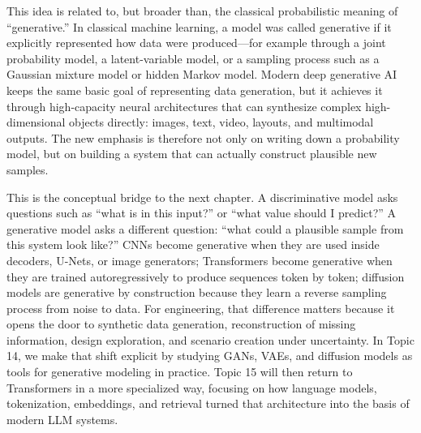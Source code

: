 \documentclass[12pt]{article}
\begin{document}
This idea is related to, but broader than, the classical probabilistic meaning of ``generative.'' In classical machine learning, a model was called generative if it explicitly represented how data were produced---for example through a joint probability model, a latent-variable model, or a sampling process such as a Gaussian mixture model or hidden Markov model. Modern deep generative AI keeps the same basic goal of representing data generation, but it achieves it through high-capacity neural architectures that can synthesize complex high-dimensional objects directly: images, text, video, layouts, and multimodal outputs. The new emphasis is therefore not only on writing down a probability model, but on building a system that can actually construct plausible new samples.

This is the conceptual bridge to the next chapter. A discriminative model asks questions such as ``what is in this input?'' or ``what value should I predict?'' A generative model asks a different question: ``what could a plausible sample from this system look like?'' CNNs become generative when they are used inside decoders, U-Nets, or image generators; Transformers become generative when they are trained autoregressively to produce sequences token by token; diffusion models are generative by construction because they learn a reverse sampling process from noise to data. For engineering, that difference matters because it opens the door to synthetic data generation, reconstruction of missing information, design exploration, and scenario creation under uncertainty. In Topic 14, we make that shift explicit by studying GANs, VAEs, and diffusion models as tools for generative modeling in practice. Topic 15 will then return to Transformers in a more specialized way, focusing on how language models, tokenization, embeddings, and retrieval turned that architecture into the basis of modern LLM systems.
\end{document}

